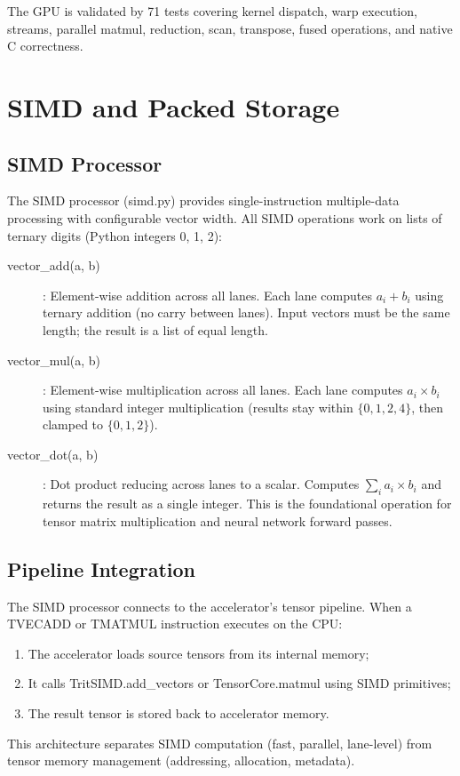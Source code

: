 \documentclass[12pt,a4paper,twoside]{book}
\theoremstyle{trinarytheorem}
\theoremstyle{trinarydefinition}
\newcommand{\code}[1]{\textsf{#1}}
\begin{document}
The GPU is validated by 71 tests covering kernel dispatch, warp execution, streams,
parallel matmul, reduction, scan, transpose, fused operations, and native C correctness.

\chapter{SIMD and Packed Storage}
\label{ch:simd}

\section{SIMD Processor}

The SIMD processor (\code{simd.py}) provides single-instruction multiple-data
processing with configurable vector width. All SIMD operations work on lists of
ternary digits (Python integers 0, 1, 2):

\begin{description}
    \item[\code{vector\_add(a, b)}]: Element-wise addition across all lanes.
          Each lane computes $a_i + b_i$ using ternary addition (no carry between
          lanes). Input vectors must be the same length; the result is a list of
          equal length.
    \item[\code{vector\_mul(a, b)}]: Element-wise multiplication across all lanes.
          Each lane computes $a_i \times b_i$ using standard integer multiplication
          (results stay within $\{0,1,2,4\}$, then clamped to $\{0,1,2\}$).
    \item[\code{vector\_dot(a, b)}]: Dot product reducing across lanes to a scalar.
          Computes $\sum_i a_i \times b_i$ and returns the result as a single integer.
          This is the foundational operation for tensor matrix multiplication and
          neural network forward passes.
\end{description}

\section{Pipeline Integration}

The SIMD processor connects to the accelerator's tensor pipeline. When a TVECADD
or TMATMUL instruction executes on the CPU:
\begin{enumerate}
    \item The accelerator loads source tensors from its internal memory;
    \item It calls \code{TritSIMD.add\_vectors} or \code{TensorCore.matmul}
          using SIMD primitives;
    \item The result tensor is stored back to accelerator memory.
\end{enumerate}
This architecture separates SIMD computation (fast, parallel, lane-level) from
tensor memory management (addressing, allocation, metadata).
\end{document}
